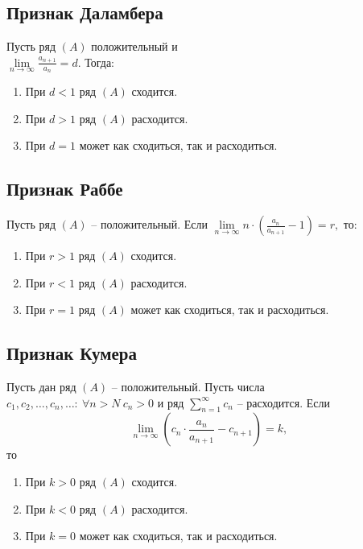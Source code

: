 \subsection{Признак Даламбера}

\begin{theorem}
    Пусть ряд $(A)$ положительный и  \\ $ \underset{n\rightarrow\infty}{\lim}\frac{a_{n+1}}{a_n} = d $. Тогда:
    \begin{enumerate}
        \item При $d < 1$ ряд $(A)$ сходится.
        \item При $d > 1$ ряд $(A)$ расходится.
        \item При $d = 1$ может как сходиться, так и расходиться.
    \end{enumerate}
\end{theorem}

\subsection{Признак Раббе}

\begin{theorem}
    Пусть ряд $(A)$ -- положительный. Если $ \underset{n\rightarrow\infty}{\lim}n \cdot \left(\frac{a_n}{a_{n+1}} - 1\right) = r, $ то:
    \begin{enumerate}
        \item При $r>1$ ряд $(A)$ сходится.
        \item При $r<1$ ряд $(A)$ расходится.
        \item При $r=1$ ряд $(A)$ может как сходиться, так и расходиться.
    \end{enumerate}
\end{theorem}

\subsection{Признак Кумера}

\begin{theorem}
    Пусть дан ряд $(A)$ -- положительный. Пусть числа $c_1,c_2,\ldots,c_n,\ldots: \ \forall n > N \ c_n > 0$ и ряд $\sum_{n=1}^{\infty}c_n$ -- расходится. Если
    \[
        \underset{n\rightarrow\infty}{\lim}\left(c_n \cdot \frac{a_n}{a_{n+1}} - c_{n+1}\right) = k,
    \]
    то
    \begin{enumerate}
        \item При $k > 0$ ряд $(A)$ сходится.
        \item При $k < 0$ ряд $(A)$ расходится.
        \item При $k = 0$ может как сходиться, так и расходиться.
    \end{enumerate}
\end{theorem}

